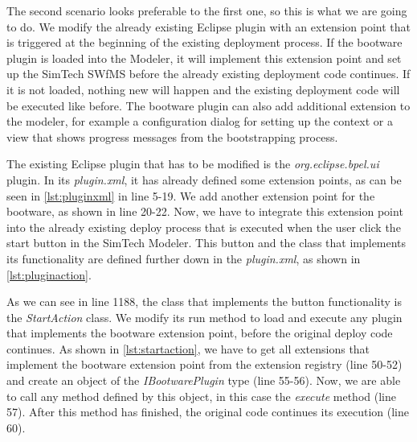 The second scenario looks preferable to the first one, so this is what we are going to do.
We modify the already existing Eclipse plugin with an extension point that is triggered at the beginning of the existing deployment process.
If the bootware plugin is loaded into the Modeler, it will implement this extension point and set up the SimTech SWfMS before the already existing deployment code continues.
If it is not loaded, nothing new will happen and the existing deployment code will be executed like before.
The bootware plugin can also add additional extension to the modeler, for example a configuration dialog for setting up the context or a view that shows progress messages from the bootstrapping process.

The existing Eclipse plugin that has to be modified is the \textit{org.eclipse.bpel.ui} plugin.
In its \textit{plugin.xml}, it has already defined some extension points, as can be seen in \autoref{lst:pluginxml} in line 5-19.
We add another extension point for the bootware, as shown in line 20-22.
Now, we have to integrate this extension point into the already existing deploy process that is executed when the user click the start button in the SimTech Modeler.
This button and the class that implements its functionality are defined further down in the \textit{plugin.xml}, as shown in \autoref{lst:pluginaction}.

\vspace*{\baselineskip}

As we can see in line 1188, the class that implements the button functionality is the \textit{StartAction} class.
We modify its run method to load and execute any plugin that implements the bootware extension point, before the original deploy code continues.
As shown in \autoref{lst:startaction}, we have to get all extensions that implement the bootware extension point from the extension registry (line 50-52) and create an object of the \textit{IBootwarePlugin} type (line 55-56).
Now, we are able to call any method defined by this object, in this case the \textit{execute} method (line 57).
After this method has finished, the original code continues its execution (line 60).

